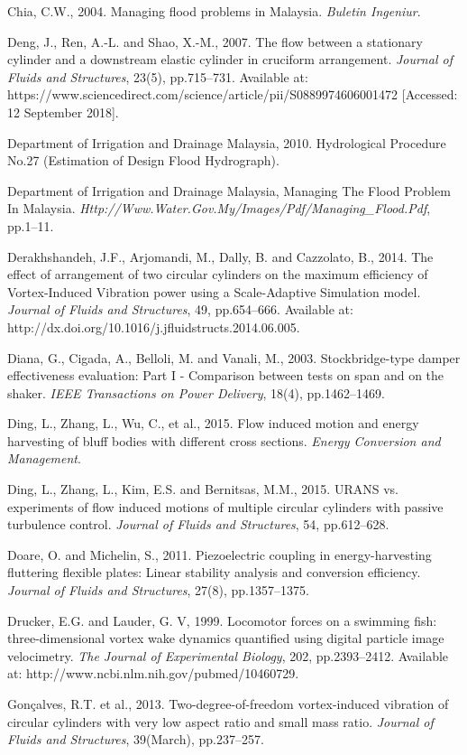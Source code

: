 \documentclass[]{article}
\begin{document}
Chia, C.W., 2004. Managing flood problems in Malaysia. \emph{Buletin
Ingeniur}.

Deng, J., Ren, A.-L. and Shao, X.-M., 2007. The flow between a
stationary cylinder and a downstream elastic cylinder in cruciform
arrangement. \emph{Journal of Fluids and Structures}, 23(5),
pp.715--731. Available at:
https://www.sciencedirect.com/science/article/pii/S0889974606001472
{[}Accessed: 12 September 2018{]}.

Department of Irrigation and Drainage Malaysia, 2010. Hydrological
Procedure No.27 (Estimation of Design Flood Hydrograph).

Department of Irrigation and Drainage Malaysia, Managing The Flood
Problem In Malaysia.
\emph{Http://Www.Water.Gov.My/Images/Pdf/Managing\_Flood.Pdf}, pp.1--11.

Derakhshandeh, J.F., Arjomandi, M., Dally, B. and Cazzolato, B., 2014.
The effect of arrangement of two circular cylinders on the maximum
efficiency of Vortex-Induced Vibration power using a Scale-Adaptive
Simulation model. \emph{Journal of Fluids and Structures}, 49,
pp.654--666. Available at:
http://dx.doi.org/10.1016/j.jfluidstructs.2014.06.005.

Diana, G., Cigada, A., Belloli, M. and Vanali, M., 2003.
Stockbridge-type damper effectiveness evaluation: Part I - Comparison
between tests on span and on the shaker. \emph{IEEE Transactions on
Power Delivery}, 18(4), pp.1462--1469.

Ding, L., Zhang, L., Wu, C., et al., 2015. Flow induced motion and
energy harvesting of bluff bodies with different cross sections.
\emph{Energy Conversion and Management}.

Ding, L., Zhang, L., Kim, E.S. and Bernitsas, M.M., 2015. URANS vs.
experiments of flow induced motions of multiple circular cylinders with
passive turbulence control. \emph{Journal of Fluids and Structures}, 54,
pp.612--628.

Doare, O. and Michelin, S., 2011. Piezoelectric coupling in
energy-harvesting fluttering flexible plates: Linear stability analysis
and conversion efficiency. \emph{Journal of Fluids and Structures},
27(8), pp.1357--1375.

Drucker, E.G. and Lauder, G. V, 1999. Locomotor forces on a swimming
fish: three-dimensional vortex wake dynamics quantified using digital
particle image velocimetry. \emph{The Journal of Experimental Biology},
202, pp.2393--2412. Available at:
http://www.ncbi.nlm.nih.gov/pubmed/10460729.

Gonçalves, R.T. et al., 2013. Two-degree-of-freedom vortex-induced
vibration of circular cylinders with very low aspect ratio and small
mass ratio. \emph{Journal of Fluids and Structures}, 39(March),
pp.237--257.
\end{document}
